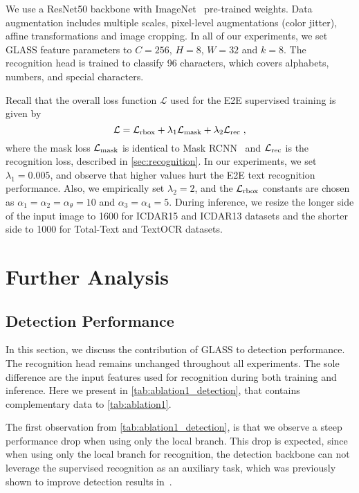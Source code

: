 \documentclass[runningheads]{llncs}
\begin{document}
We use a ResNet50 backbone with ImageNet~\cite{russakovsky2015imagenet} pre-trained weights.
Data augmentation includes multiple scales, pixel-level augmentations (color jitter), affine transformations and image cropping. 
In all of our experiments, we set GLASS feature parameters  to ${ C= 256}$, ${ H=8}$, ${ W= 32}$ and ${ k = 8}$.
The recognition head is trained to classify 96 characters, which covers alphabets, numbers, and special characters. 

Recall that the overall loss function $\mathcal{L}$ used for the E2E supervised training is given by
\begin{equation}
    \mathcal{L} =  \mathcal{L}_{\rm rbox} +  \lambda_1  \mathcal{L}_{\rm mask} + \lambda_2  \mathcal{L}_{\rm rec}
    \;,
   \label{eq:total_loss_supp}
\end{equation}
where the mask loss $\mathcal{L}_{\rm mask}$ is identical to Mask RCNN~\cite{he2017mask} and $\mathcal{L}_{\rm rec}$ is the recognition loss, described in \cref{sec:recognition}.
In our experiments, we set $\lambda_1=0.005$, and observe that higher values hurt the E2E text recognition performance.
Also, we empirically set $\lambda_2=2$, and the $\mathcal{L}_{\rm rbox}$ constants are chosen as $\alpha_1=\alpha_2=\alpha_\theta=10$ and $\alpha_3=\alpha_4=5$.
During inference, we resize the longer side of the input image to 1600 for ICDAR15 and ICDAR13 datasets and the shorter side to 1000 for Total-Text and TextOCR datasets.


\section{Further Analysis}
\label{sec:further}

\subsection{Detection Performance}

In this section, we discuss the contribution of GLASS to detection performance.
The recognition head remains unchanged throughout all experiments.
The sole difference are the input features used for recognition during both training and inference.
Here we present in \cref{tab:ablation1_detection}, that contains complementary data to \cref{tab:ablation1}. 

The first observation from \cref{tab:ablation1_detection}, is that we observe a steep performance drop when using only the local branch.
This drop is expected, since when using only the local branch for recognition, the detection backbone can not leverage the supervised recognition as an auxiliary task, which was previously shown to improve detection results in~\cite{qin2019towards,wang2021towards}.
\end{document}
